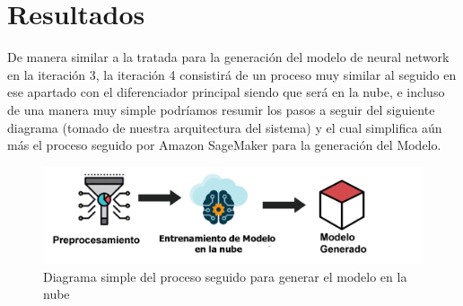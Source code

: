 \documentclass[12pt, a4paper, titlepage]{report}
\begin{document}
	\section{Resultados}
	De manera similar a la tratada para la generación del modelo de neural network en la iteración 3, la iteración 4 consistirá de un proceso muy similar al seguido en ese apartado con el diferenciador principal siendo que será en la nube, e incluso de una manera muy simple podríamos resumir los pasos a seguir del siguiente diagrama (tomado de nuestra arquitectura del sistema) y el cual simplifica aún más el proceso seguido por Amazon SageMaker para la generación del Modelo.
		
	\begin{figure}[H]
	\includegraphics[width=12cm]{./imagenes/Disenio/Iteracion_4/resultado_arquitectura.png}
	\centering 
	\caption{Diagrama simple del proceso seguido para generar el modelo en la nube}
	\end{figure}
	
	\newpage
\end{document}
